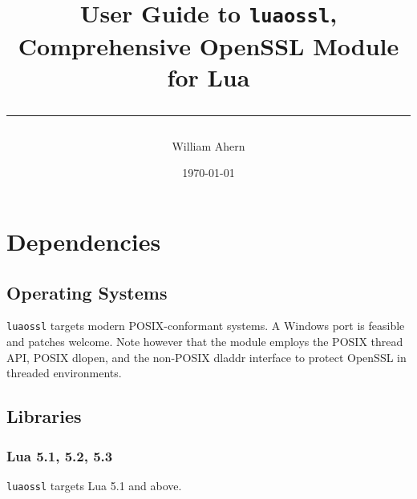\documentclass[11pt, oneside]{memoir}
\newcommand*{\luaossl}[0]{\texttt{luaossl}\xspace}
\begin{document}

\title{

\vspace*{10ex}

\HUGE\sffamily User Guide to \luaossl, \\


\HUGE Comprehensive OpenSSL Module for Lua \\

\vspace*{30pt}
\hrule
}

\date{\today}
\author{William Ahern}
\maketitle
\thispagestyle{empty}
\clearpage

\setcounter{page}{1}
\tableofcontents

\clearpage

\setcounter{page}{1}

\setlength{\beforechapskip}{1ex}
\setlength{\afterchapskip}{1ex}

\chapter{Dependencies}

\section{Operating Systems}

\luaossl targets modern POSIX-conformant systems. A Windows port is feasible and patches welcome.
Note however that the module employs the POSIX thread API, POSIX dlopen, and the non-POSIX dladdr interface to protect OpenSSL in threaded environments.

\section{Libraries}

\subsection{Lua 5.1, 5.2, 5.3}

\luaossl targets Lua 5.1 and above.
\end{document}
